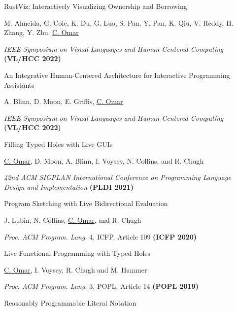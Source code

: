 \documentclass[10pt,letterpaper]{article}
\renewenvironment{itemize}{
  \begin{list}{}{
    \setlength{\leftmargin}{1.25em}
    \setlength{\itemsep}{0.25em}
    \setlength{\parskip}{0pt}
    \setlength{\parsep}{0.2em}
  }
}{
  \end{list}
}
\begin{document}
\begin{enumerate}
\item {RustViz: Interactively Visualizing Ownership and Borrowing}
  \begin{itemize}
    \item M. Almeida, G. Cole, K. Du, G. Luo, S. Pan, Y. Pan, K. Qiu, V. Reddy, H. Zhang, Y. Zhu, \underline{C. Omar}
    \item \textit{IEEE Symposium on Visual Languages and Human-Centered Computing} \textbf{(VL/HCC 2022)}
  \end{itemize}
\item {An Integrative Human-Centered Architecture for Interactive Programming Assistants}
  \begin{itemize}
    \item A. Blinn, D. Moon, E. Griffis, \underline{C. Omar}
    \item \textit{IEEE Symposium on Visual Languages and Human-Centered Computing} \textbf{(VL/HCC 2022)}
  \end{itemize}
\item {Filling Typed Holes with Live GUIs}
  \begin{itemize}
    \item \underline{C. Omar}, D. Moon, A. Blinn, I. Voysey, N. Collins, and R. Chugh
    \item \textit{42nd ACM SIGPLAN International Conference on Programming Language Design and Implementation} \textbf{(PLDI 2021)}
  \end{itemize}
\item {Program Sketching with Live Bidirectional Evaluation}
  \begin{itemize}
    \item J. Lubin, N. Collins, \underline{C. Omar}, and R. Chugh
    \item \textit{Proc. ACM Program. Lang.} 4, ICFP, Article 109 \textbf{(ICFP 2020)}
  \end{itemize}
\item {Live Functional Programming with Typed Holes}
  \begin{itemize}
    \item \underline{C. Omar}, I. Voysey, R. Chugh and M. Hammer
    \item \textit{Proc. ACM Program. Lang.} 3, POPL, Article 14 \textbf{(POPL 2019)}
  \end{itemize}
\item {Reasonably Programmable Literal Notation}
  \begin{itemize}

\end{itemize}
\end{enumerate}
\end{document}
